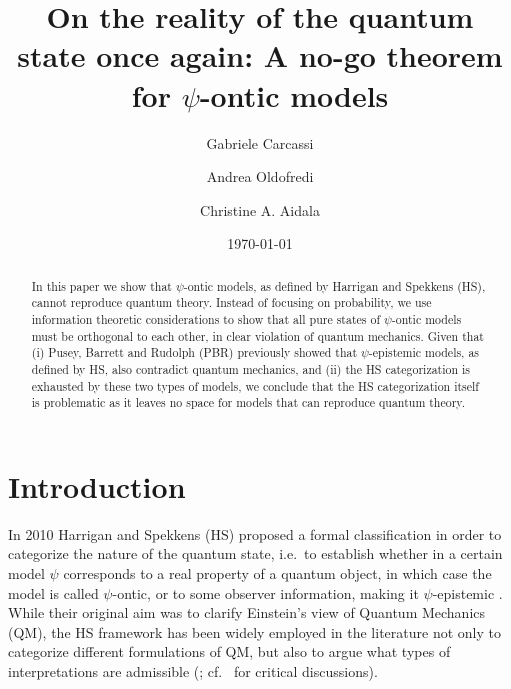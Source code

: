 \documentclass[10pt,twocolumn, nofootinbib]{revtex4-2}
\begin{document}
\title{On the reality of the quantum state once again: A no-go theorem for $\psi$-ontic models}
\author{Gabriele Carcassi}
\author{Andrea Oldofredi}
\author{Christine A. Aidala}
\vspace{2mm}

\date{\today}


\begin{abstract}
In this paper we show that $\psi$-ontic models, as defined by Harrigan and Spekkens (HS), cannot reproduce quantum theory. Instead of focusing on probability, we use information theoretic considerations to show that all pure states of $\psi$-ontic models must be orthogonal to each other, in clear violation of quantum mechanics. Given that (i) Pusey, Barrett and Rudolph (PBR) previously showed that $\psi$-epistemic models, as defined by HS, also contradict quantum mechanics, and (ii) the HS categorization is exhausted by these two types of models, we conclude that the HS categorization itself is problematic as it leaves no space for models that can reproduce quantum theory.
\end{abstract}

\maketitle

\section{Introduction}
 
In 2010 Harrigan and Spekkens (HS) proposed a formal classification in order to categorize the nature of the quantum state, i.e.\ to establish whether in a certain model $\psi$ corresponds to a real property of a quantum object, in which case the model is called $\psi$-ontic, or to some observer information, making it $\psi$-epistemic \cite{Harrigan:2010}. While their original aim was to clarify Einstein's view of Quantum Mechanics (QM), the HS framework has been widely employed in the literature not only to categorize different formulations of QM, but also to argue what types of interpretations are admissible (\cite{Leifer:2013, Leifer:2017, Branciard:2014, Hermens:2021, Wood:2015, Ringbauer:2015, Mazurek:2016, Bartlett:2012}; cf.\ \cite{Oldofredi:2020b, Ladyman:2021} for critical discussions). 
\end{document}
